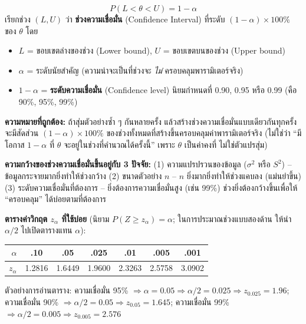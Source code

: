\documentclass[10pt]{extarticle}
\begin{document}
\begin{formulabox}
$$P(L<\theta<U)=1-\alpha$$
เรียกช่วง $(L,U)$ ว่า \textbf{ช่วงความเชื่อมั่น} (Confidence Interval) ที่ระดับ $(1-\alpha)\times100\%$ ของ $\theta$ โดย
\begin{itemize}
\item $L$ = ขอบเขตล่างของช่วง (Lower bound), $U$ = ขอบเขตบนของช่วง (Upper bound)
\item $\alpha$ = ระดับนัยสำคัญ (ความน่าจะเป็นที่ช่วงจะ \textit{ไม่} ครอบคลุมพารามิเตอร์จริง)
\item $1-\alpha$ = \textbf{ระดับความเชื่อมั่น} (Confidence level) นิยมกำหนดที่ 0.90, 0.95 หรือ 0.99 (คือ 90\%, 95\%, 99\%)
\end{itemize}
\textbf{ความหมายที่ถูกต้อง:} ถ้าสุ่มตัวอย่างซ้ำ ๆ กันหลายครั้ง แล้วสร้างช่วงความเชื่อมั่นแบบเดียวกันทุกครั้ง จะมีสัดส่วน $(1-\alpha)\times100\%$ ของช่วงทั้งหมดที่สร้างขึ้นครอบคลุมค่าพารามิเตอร์จริง (ไม่ใช่ว่า ``มีโอกาส $1-\alpha$ ที่ $\theta$ จะอยู่ในช่วงที่คำนวณได้ครั้งนี้'' เพราะ $\theta$ เป็นค่าคงที่ ไม่ใช่ตัวแปรสุ่ม)
\end{formulabox}

\begin{center}
\end{center}

\textbf{ความกว้างของช่วงความเชื่อมั่นขึ้นอยู่กับ 3 ปัจจัย:} (1) ความแปรปรวนของข้อมูล ($\sigma^2$ หรือ $S^2$) -- ข้อมูลกระจายมากยิ่งทำให้ช่วงกว้าง (2) ขนาดตัวอย่าง $n$ -- $n$ ยิ่งมากยิ่งทำให้ช่วงแคบลง (แม่นยำขึ้น) (3) ระดับความเชื่อมั่นที่ต้องการ -- ยิ่งต้องการความเชื่อมั่นสูง (เช่น 99\%) ช่วงยิ่งต้องกว้างขึ้นเพื่อให้ ``ครอบคลุม'' ได้บ่อยตามที่ต้องการ

\textbf{ตารางค่าวิกฤต $z_\alpha$ ที่ใช้บ่อย} (นิยาม $P(Z\ge z_\alpha)=\alpha$; ในการประมาณช่วงแบบสองด้าน ให้นำ $\alpha/2$ ไปเปิดตารางแทน $\alpha$):
\begin{center}
\small
\begin{tabular}{r|cccccc}
\rowcolor{lightbg}$\alpha$ & .10 & .05 & .025 & .01 & .005 & .001\\\hline
$z_\alpha$ & 1.2816 & 1.6449 & 1.9600 & 2.3263 & 2.5758 & 3.0902\\
\end{tabular}
\end{center}
ตัวอย่างการอ่านตาราง: ความเชื่อมั่น 95\% $\Rightarrow \alpha=0.05 \Rightarrow \alpha/2=0.025 \Rightarrow z_{0.025}=1.96$; ความเชื่อมั่น 90\% $\Rightarrow \alpha/2=0.05 \Rightarrow z_{0.05}=1.645$; ความเชื่อมั่น 99\% $\Rightarrow \alpha/2=0.005 \Rightarrow z_{0.005}=2.576$
\end{document}

